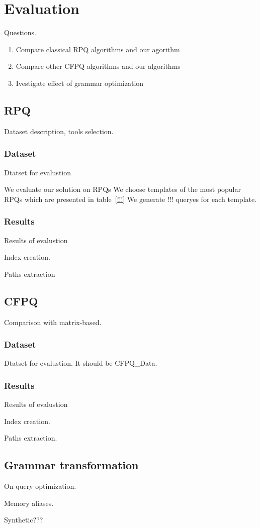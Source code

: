 \section{Evaluation}

Questions.
\begin{enumerate}
	\item Compare classical RPQ algorithms and our agorithm
	\item Compare other CFPQ algorithms and our algorithms
	\item Ivestigate effect of grammar optimization
\end{enumerate}

\subsection{RPQ}

Dataset description, tools selection.

\subsubsection{Dataset}

Dtatset for evalustion

We evaluate our solution on RPQs 
We choose templates of the most popular RPQs which are presented in table~\ref{!!!}
We generate !!! queryes for each template.

\subsubsection{Results}

Results of evalustion

Index creation.

Paths extraction

\subsection{CFPQ}

Comparison with matrix-based.

\subsubsection{Dataset}

Dtatset for evalustion. 
It should be CFPQ\_Data.

\subsubsection{Results}

Results of evalustion

Index creation.

Paths extraction.

\subsection{Grammar transformation}

On query optimization.

Memory aliases.

Synthetic???
